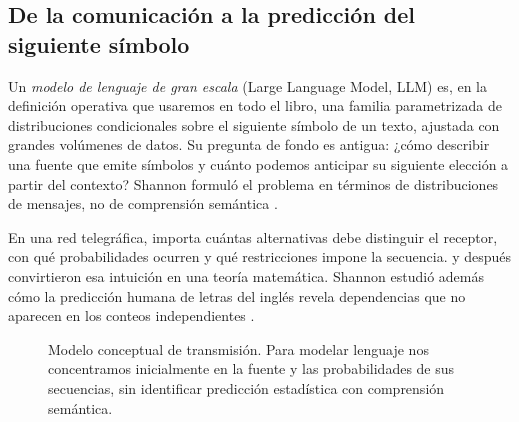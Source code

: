 \subsection{De la comunicación a la predicción del siguiente símbolo}\label{s01:cap:comunicacion}
\begin{idea}
Un \emph{modelo de lenguaje de gran escala} (Large Language Model, LLM) es, en
la definición operativa que usaremos en todo el libro, una familia parametrizada
de distribuciones condicionales sobre el siguiente símbolo de un texto, ajustada
con grandes volúmenes de datos. Su pregunta de fondo es antigua:
¿cómo describir una fuente que emite símbolos y cuánto podemos anticipar
su siguiente elección a partir del contexto? Shannon formuló el problema
en términos de distribuciones de mensajes, no de comprensión semántica
\citep{shannon1948,shannon1951}.
\end{idea}
En una red telegráfica, importa cuántas alternativas debe distinguir el
receptor, con qué probabilidades ocurren y qué restricciones impone la
secuencia. \citet{hartley1928} y después \citet{shannon1948}
convirtieron esa intuición en una teoría matemática. Shannon estudió
además cómo la predicción humana de letras del inglés revela dependencias
que no aparecen en los conteos independientes \citep{shannon1951}.

\begin{figure}[htbp]\centering
{}
\caption{Modelo conceptual de transmisión. Para modelar lenguaje nos
concentramos inicialmente en la fuente y las probabilidades de sus
secuencias, sin identificar predicción estadística con comprensión semántica.}
\label{fig:c1:shannon-canal}
\end{figure}


